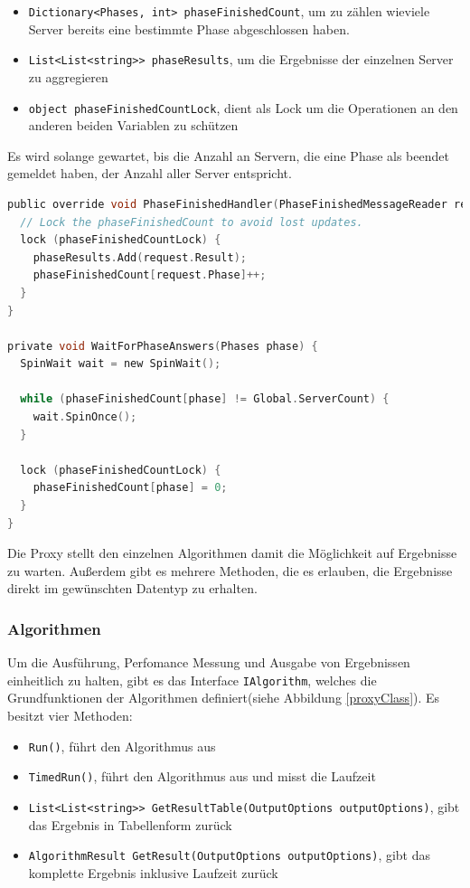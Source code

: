 \begin{itemize}
  \item \verb|Dictionary<Phases, int> phaseFinishedCount|, um zu zählen wieviele Server bereits eine bestimmte Phase abgeschlossen haben.
  \item \verb|List<List<string>> phaseResults|, um die Ergebnisse der einzelnen Server zu aggregieren
  \item \verb|object phaseFinishedCountLock|, dient als Lock um die Operationen an den anderen beiden Variablen zu schützen
\end{itemize}

Es wird solange gewartet, bis die Anzahl an Servern, die eine Phase als beendet gemeldet haben, der Anzahl aller Server entspricht.

\begin{lstlisting}[language=c, caption={Implementierung des Mechanismus, um auf Phasen zu warten.}]
public override void PhaseFinishedHandler(PhaseFinishedMessageReader request) {
  // Lock the phaseFinishedCount to avoid lost updates.
  lock (phaseFinishedCountLock) {
    phaseResults.Add(request.Result);
    phaseFinishedCount[request.Phase]++;
  }
}

private void WaitForPhaseAnswers(Phases phase) {
  SpinWait wait = new SpinWait();

  while (phaseFinishedCount[phase] != Global.ServerCount) {
    wait.SpinOnce();
  }

  lock (phaseFinishedCountLock) {
    phaseFinishedCount[phase] = 0;
  }
}
\end{lstlisting}

Die Proxy stellt den einzelnen Algorithmen damit die Möglichkeit auf Ergebnisse zu warten. Außerdem gibt es mehrere Methoden, die es erlauben, die Ergebnisse direkt im gewünschten Datentyp zu erhalten.

\subsubsection{Algorithmen}

Um die Ausführung, Perfomance Messung und Ausgabe von Ergebnissen einheitlich zu halten, gibt es das Interface \verb|IAlgorithm|, welches die Grundfunktionen der Algorithmen definiert(siehe Abbildung \ref{proxyClass}).
Es besitzt vier Methoden:

\begin{itemize}
  \item \verb|Run()|, führt den Algorithmus aus
  \item \verb|TimedRun()|, führt den Algorithmus aus und misst die Laufzeit
  \item \verb|List<List<string>> GetResultTable(OutputOptions outputOptions)|, gibt das Ergebnis in Tabellenform zurück
  \item \verb|AlgorithmResult GetResult(OutputOptions outputOptions)|, gibt das komplette Ergebnis inklusive Laufzeit zurück
\end{itemize}

